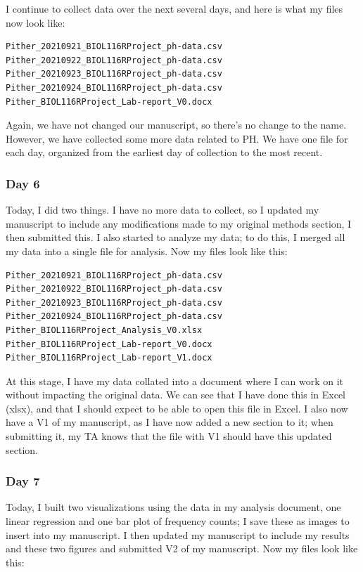 \documentclass[
]{book}
\begin{document}
I continue to collect data over the next several days, and here is what my files now look like:

\begin{verbatim}
Pither_20210921_BIOL116RProject_ph-data.csv
Pither_20210922_BIOL116RProject_ph-data.csv
Pither_20210923_BIOL116RProject_ph-data.csv
Pither_20210924_BIOL116RProject_ph-data.csv
Pither_BIOL116RProject_Lab-report_V0.docx
\end{verbatim}

Again, we have not changed our manuscript, so there's no change to the name. However, we have collected some more data related to PH. We have one file for each day, organized from the earliest day of collection to the most recent.

\subsubsection*{Day 6}\label{day-6}

Today, I did two things. I have no more data to collect, so I updated my manuscript to include any modifications made to my original methods section, I then submitted this. I also started to analyze my data; to do this, I merged all my data into a single file for analysis. Now my files look like this:

\begin{verbatim}
Pither_20210921_BIOL116RProject_ph-data.csv
Pither_20210922_BIOL116RProject_ph-data.csv
Pither_20210923_BIOL116RProject_ph-data.csv
Pither_20210924_BIOL116RProject_ph-data.csv
Pither_BIOL116RProject_Analysis_V0.xlsx
Pither_BIOL116RProject_Lab-report_V0.docx
Pither_BIOL116RProject_Lab-report_V1.docx
\end{verbatim}

At this stage, I have my data collated into a document where I can work on it without impacting the original data. We can see that I have done this in Excel (xlsx), and that I should expect to be able to open this file in Excel. I also now have a V1 of my manuscript, as I have now added a new section to it; when submitting it, my TA knows that the file with V1 should have this updated section.

\subsubsection*{Day 7}\label{day-7}

Today, I built two visualizations using the data in my analysis document, one linear regression and one bar plot of frequency counts; I save these as images to insert into my manuscript. I then updated my manuscript to include my results and these two figures and submitted V2 of my manuscript. Now my files look like this:
\end{document}
